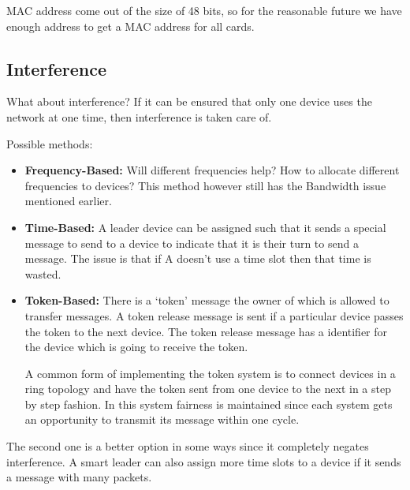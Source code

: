 \documentclass[12pt]{article}
\begin{document}
MAC address come out of the size of 48 bits, so for the reasonable future we have enough address to get a MAC
address for all cards. 


\subsection{Interference}

What about interference? If it can be ensured that only one device uses the network at one time, then 
interference is taken care of. 

Possible methods:
\begin{itemize}
    \item \textbf{Frequency-Based:} Will different frequencies help? How to allocate different frequencies to devices? This method however still has the Bandwidth issue mentioned earlier. 
    \item \textbf{Time-Based:} A leader device can be assigned such that it sends a special message to send to a device
    to indicate that it is their turn to send a message. The issue is that 
    if A doesn't use a time slot then that time is wasted. 
    \item \textbf{Token-Based:} There is a `token' message the owner of which is allowed to transfer messages. A 
    token release message is sent if a particular device passes the token to the next device. The token release message has 
    a identifier for the device which is going to receive the token. 

    A common form of implementing the token system is to connect devices in a ring topology and have the 
    token sent from one device to the next in a step by step fashion. In this system fairness is maintained since 
    each system gets an opportunity to transmit its message within one cycle. 

\end{itemize}

The second one is a better option in some ways since it completely negates interference. A smart leader can also 
assign more time slots to a device if it sends a message with many packets.
\end{document}
